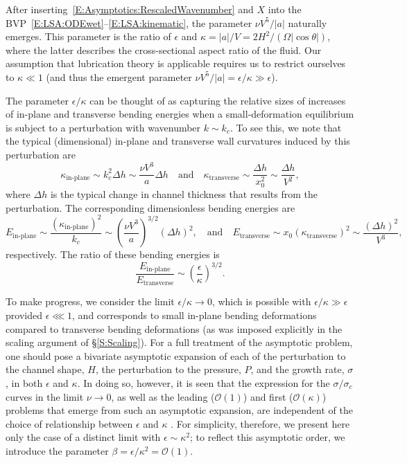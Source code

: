\documentclass{jfm}
\newcommand{\order}[1]{\mathcal{O}\left(#1\right)}
\begin{document}
After inserting~\eqref{E:Asymptotics:RescaledWavenumber} and $X$ into the BVP~\eqref{E:LSA:ODEwet}--\eqref{E:LSA:kinematic}, the parameter $\nu V^5/|a|$ naturally emerges. This parameter is the ratio of $\epsilon$ and $\kappa =|a|/V = 2H^2/ (\Omega |\cos \theta| )$, where the latter describes the cross-sectional aspect ratio of the fluid. Our assumption that lubrication theory is applicable requires us to restrict ourselves to $\kappa \ll 1$ (and thus the emergent parameter $ \nu V^5/|a| = \epsilon / \kappa \gg \epsilon$). 

The parameter $\epsilon/\kappa$ can be thought of as capturing the relative sizes of increases of in-plane and transverse bending energies when a small-deformation equilibrium is subject to a perturbation with wavenumber $k \sim k_c$.  To see this, we note that the typical (dimensional) in-plane and transverse wall curvatures induced by this perturbation are
\begin{equation}
\kappa_{\text{in-plane}} \sim k_c^2 \Delta h \sim \frac{\nu V^3}{a} \Delta h \quad \text{and}\quad \kappa_{\text{transverse}} \sim \frac{\Delta h}{x_0^2} \sim  \frac{\Delta h}{V^2},
\end{equation}
where $\Delta h$ is the typical change in channel thickness that results from the perturbation. The corresponding dimensionless bending energies are
\begin{equation}
E_{\text{in-plane}} \sim \frac{\left(\kappa_{\text{in-plane}}\right)^2}{k_c} \sim \left( \frac{\nu V^3}{a}\right)^{3/2}(\Delta h)^2,  \quad \text{and}\quad
E_{\text{transverse}} \sim x_0 \left(\kappa_{\text{transverse}}\right)^2 \sim \frac{(\Delta h)^2}{V^3},
\end{equation}
respectively. The ratio of these bending energies is 
\begin{equation}
\frac{E_{\text{in-plane}}}{ E_{\text{transverse}}}
\sim \left(\frac{\epsilon}{\kappa}\right)^{3/2}.
\end{equation}

To make progress, we consider the limit $\epsilon / \kappa \to 0$, which is possible with $\epsilon/\kappa \gg \epsilon$ provided $\epsilon \lll 1$, and corresponds to small in-plane bending deformations compared to transverse bending deformations (as was imposed explicitly in the scaling argument of \S\ref{S:Scaling}). For a full treatment of the asymptotic problem, one should pose a bivariate asymptotic expansion of each of the perturbation to the channel shape, $H$, the perturbation to the pressure,
$P$, and the growth rate, $\sigma$, in both $\epsilon$ and $\kappa$. In doing so, however, it is seen that the expression for the $\sigma/\sigma_c$ curves in the limit $\nu \to 0$, as well as the leading ($\order{1}$) and first ($\order{\kappa}$) problems that emerge from such an asymptotic expansion, are independent of the choice of relationship between $\epsilon$ and $\kappa$ \cite[see][which contains a complete treatment of this problem]{BradleyPhDthesis}. For simplicity, therefore, we present here only the case of a distinct limit with $\epsilon \sim \kappa^2$; to reflect this asymptotic order, we introduce the parameter $\beta = \epsilon/\kappa^2 = \order{1}$.
\end{document}
